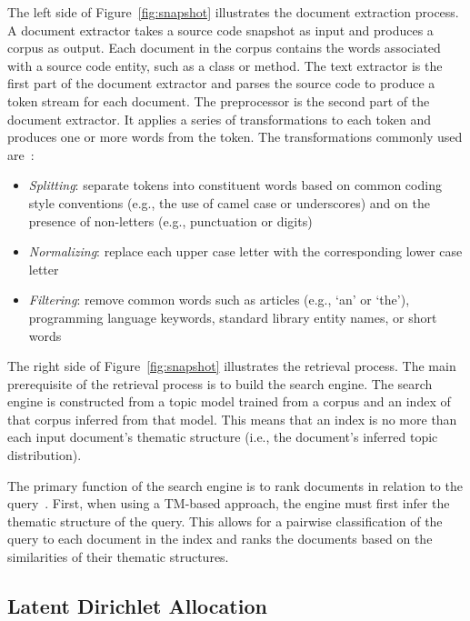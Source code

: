 The left side of Figure~\ref{fig:snapshot} illustrates the document extraction
process. A document extractor takes a source code snapshot as input and produces
a corpus as output. Each document in the corpus contains the words associated
with a source code entity, such as a class or method. The text extractor is the
first part of the document extractor and parses the source code to produce a
token stream for each document. The preprocessor is the second part of the
document extractor. It applies a series of transformations to each token and
produces one or more words from the token. The transformations commonly used
are~\cite{Marcus-etal_2004,Marcus-Menzies_2010,Lawrie-etal_2010}:
\begin{itemize}
    \item {\it Splitting}: separate tokens into constituent words based on
        common coding style conventions (e.g., the use of camel case or
        underscores) and on the presence of non-letters (e.g., punctuation or
        digits)
    \item {\it Normalizing}: replace each upper case letter with the
        corresponding lower case letter
    \item {\it Filtering}: remove common words such as articles (e.g., `an' or
        `the'), programming language keywords, standard library entity names, or
        short words
\end{itemize}

The right side of Figure~\ref{fig:snapshot} illustrates the retrieval process.
The main prerequisite of the retrieval process is to build the search engine.
The search engine is constructed from a topic model trained from a corpus and an
index of that corpus inferred from that model. This means that an index is no
more than each input document's thematic structure (i.e., the document's
inferred topic distribution).

The primary function of the search engine is to rank documents in relation to
the query~\cite{Croft-etal_2010}. First, when using a TM-based approach, the
engine must first infer the thematic structure of the query. This allows for a
pairwise classification of the query to each document in the index and ranks the
documents based on the similarities of their thematic structures.

\subsection{Latent Dirichlet Allocation}

